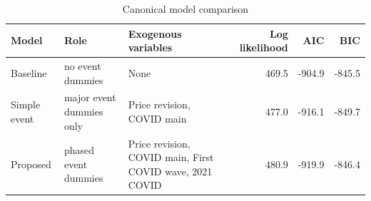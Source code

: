 \begin{table}[htbp]
  \centering
  \caption{Canonical model comparison}
  \label{tab:model-comparison}
  \begin{tabular}{lllrrr}
    \hline
    Model & Role & Exogenous variables & Log likelihood & AIC & BIC \\
    \hline
    Baseline & no event dummies & None & 469.5 & -904.9 & -845.5 \\
    Simple event & major event dummies only & Price revision, COVID main & 477.0 & -916.1 & -849.7 \\
    Proposed & phased event dummies & Price revision, COVID main, First COVID wave, 2021 COVID & 480.9 & -919.9 & -846.4 \\
    \hline
  \end{tabular}
\end{table}
